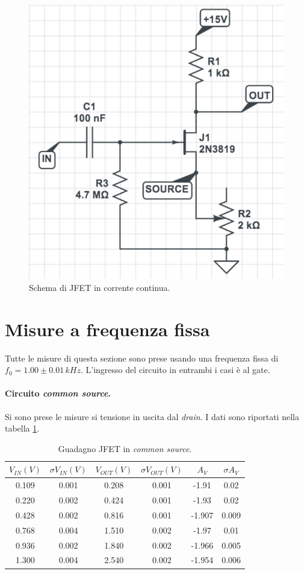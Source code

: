 \documentclass[10pt,a4paper]{article}
\begin{document}
\begin{figure}
\centering
\includegraphics[scale=0.3]{circuito2.png}
\caption{Schema di JFET in corrente continua.\label{circuito2}}
\end{figure}

\section{Misure a frequenza fissa}
Tutte le misure di questa sezione sono prese usando una frequenza fissa di $f_0 = 1.00\pm0.01\, kHz$. L'ingresso del circuito in entrambi i casi è al gate.
\paragraph{Circuito \emph{common source}.}
Si sono prese le misure si tensione in uscita dal \emph{drain}. I dati sono riportati nella tabella \ref{tabellaCommonSource}.

\begin{table}[!htb]\centering
\begin{tabular}{|c|c|c|c|c|c|}
\hline
$V_{IN} (V)$ & $\sigma V_{IN} (V)$ & $V_{OUT} (V)$ & $\sigma V_{OUT} (V)$ & $A_V$ & $\sigma A_V$\\
\hline
0.109 & 0.001 & 0.208 & 0.001 & -1.91 & 0.02\\
0.220 & 0.002 & 0.424 & 0.001 & -1.93 & 0.02\\
0.428 & 0.002 & 0.816 & 0.001 & -1.907 & 0.009\\
0.768 & 0.004 & 1.510 & 0.002 & -1.97 & 0.01\\
0.936 & 0.002 & 1.840 & 0.002 & -1.966 & 0.005\\
1.300 & 0.004 & 2.540 & 0.002 & -1.954 & 0.006\\
\hline
\end{tabular}
\caption{Guadagno JFET in \emph{common source}.}
\label{tabellaCommonSource}
\end{table}
\end{document}
